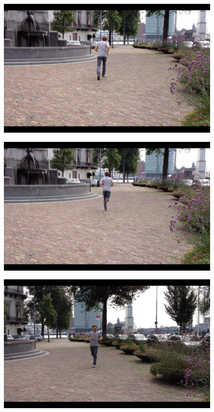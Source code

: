 
\begin{figure}
\centering
  \includegraphics[width=1\textwidth]{./Figures/chapter6/data_collection/stills/jos cp walk-run.png}
  \caption[]{}
\end{figure}

\begin{figure}
\centering
  \includegraphics[width=1\textwidth]{./Figures/chapter6/data_collection/stills/jos run 2.png}
  \caption[]{}
\end{figure}

\begin{figure}
\centering
  \includegraphics[width=1\textwidth]{./Figures/chapter6/data_collection/stills/jos run.png}
  \caption[]{}
\end{figure}

